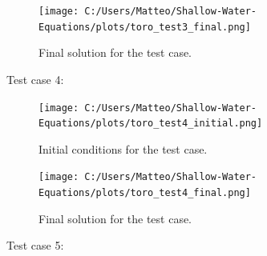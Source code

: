\begin{figure}[H]
    \centering
    \texttt{[image: C:/Users/Matteo/Shallow-Water-Equations/plots/toro\_test3\_final.png]}
    \caption{Final solution for the test case.}\label{fig:toro_test3_final}
\end{figure}


Test case 4:

\begin{figure}[H]
    \centering
    \texttt{[image: C:/Users/Matteo/Shallow-Water-Equations/plots/toro\_test4\_initial.png]}
    \caption{Initial conditions for the test case.}\label{fig:toro_test3_initial}
\end{figure}

\begin{figure}[H]
    \centering
    \texttt{[image: C:/Users/Matteo/Shallow-Water-Equations/plots/toro\_test4\_final.png]}
    \caption{Final solution for the test case.}\label{fig:toro_test3_final}
\end{figure}



Test case 5:
